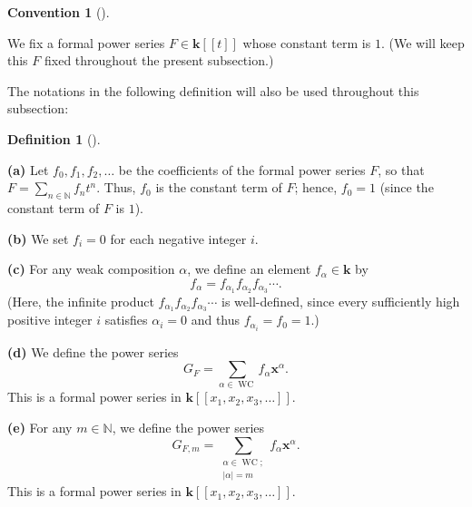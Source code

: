 \documentclass[numbers=enddot,12pt,final,onecolumn,notitlepage]{scrartcl}%
\theoremstyle{definition}
\newtheorem{defi}[theo]{Definition}
\newenvironment{definition}[1][]
{\begin{defi}[#1]\begin{leftbar}}
{\end{leftbar}\end{defi}}
\newtheorem{conv}[theo]{Convention}
\newenvironment{convention}[1][]
{\begin{conv}[#1]\begin{leftbar}}
{\end{leftbar}\end{conv}}
\let\sumnonlimits\sum
\renewcommand{\sum}{\sumnonlimits\limits}
\begin{document}
\begin{convention}
We fix a formal power series $F\in\mathbf{k}\left[  \left[  t\right]  \right]
$ whose constant term is $1$. (We will keep this $F$ fixed throughout the
present subsection.)
\end{convention}

The notations in the following definition will also be used throughout this subsection:

\begin{definition}
\label{def.GF.GF}\textbf{(a)} Let $f_{0},f_{1},f_{2},\ldots$ be the
coefficients of the formal power series $F$, so that $F=\sum_{n\in\mathbb{N}%
}f_{n}t^{n}$. Thus, $f_{0}$ is the constant term of $F$; hence, $f_{0}=1$
(since the constant term of $F$ is $1$).

\textbf{(b)} We set $f_{i}=0$ for each negative integer $i$.

\textbf{(c)} For any weak composition $\alpha$, we define an element
$f_{\alpha}\in\mathbf{k}$ by%
\[
f_{\alpha}=f_{\alpha_{1}}f_{\alpha_{2}}f_{\alpha_{3}}\cdots.
\]
(Here, the infinite product $f_{\alpha_{1}}f_{\alpha_{2}}f_{\alpha_{3}}\cdots$
is well-defined, since every sufficiently high positive integer $i$ satisfies
$\alpha_{i}=0$ and thus $f_{\alpha_{i}}=f_{0}=1$.)

\textbf{(d)} We define the power series%
\begin{equation}
G_{F}=\sum_{\alpha\in\operatorname*{WC}}f_{\alpha}\mathbf{x}^{\alpha}.
\label{eq.GF=}%
\end{equation}
This is a formal power series in $\mathbf{k}\left[  \left[  x_{1},x_{2}%
,x_{3},\ldots\right]  \right]  $.

\textbf{(e)} For any $m\in\mathbb{N}$, we define the power series%
\begin{equation}
G_{F,m}=\sum_{\substack{\alpha\in\operatorname*{WC};\\\left\vert
\alpha\right\vert =m}}f_{\alpha}\mathbf{x}^{\alpha}. \label{eq.GFm=}%
\end{equation}
This is a formal power series in $\mathbf{k}\left[  \left[  x_{1},x_{2}%
,x_{3},\ldots\right]  \right]  $.
\end{definition}
\end{document}

